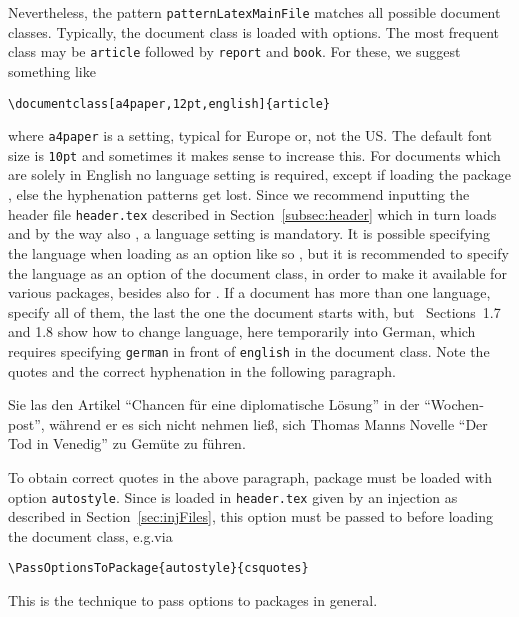 Nevertheless, the pattern \texttt{patternLatexMainFile} 
matches all possible document classes. 
Typically, the document class is loaded with options. 
The most frequent class may be \texttt{article} 
followed by \texttt{report} and \texttt{book}. 
For these, we suggest something like
%
\begin{Verbatim}
\documentclass[a4paper,12pt,english]{article}
\end{Verbatim}
%
where \texttt{a4paper} is a setting, typical for Europe or, not the US\@. 
The default font size is \texttt{10pt} and sometimes it makes sense to increase this. 
For documents which are solely in English no language setting is required, 
except if loading the package , else the hyphenation patterns get lost. 
Since we recommend inputting the header file \texttt{header.tex} 
described in Section~\ref{subsec:header} which in turn loads  and 
by the way also , a language setting is mandatory. 
It is possible specifying the language when loading  as an option 
like so , 
but it is recommended to specify the language as an option of the document class, 
in order to make it available for various packages, 
besides  also for . 
If a document has more than one language, specify all of them, 
the last the one the document starts with, 
but~\cite{BabelP24} Sections~1.7 and 1.8 show how to change language, 
here temporarily into German, 
which requires specifying \texttt{german} in front of \texttt{english} 
in the document class. 
Note the quotes and the correct hyphenation in the following paragraph. 

\begin{otherlanguage}{german}
  Sie las den Artikel \enquote{Chancen für eine diplomatische Lösung} 
  in der "`Wochenpost"', während er es sich nicht nehmen ließ, %
  sich Thomas Manns Novelle "`{Der Tod in Venedig}"' zu Gemüte zu führen. %
\end{otherlanguage}

To obtain correct quotes in the above paragraph, 
package  must be loaded with option \texttt{autostyle}. 
Since  is loaded in \texttt{header.tex} 
given by an injection as described in Section~\ref{sec:injFiles}, 
this option must be passed to  
before loading the document class, e.g.\@ via 
%
\begin{Verbatim}[fontsize=\small]
  \PassOptionsToPackage{autostyle}{csquotes}
\end{Verbatim}
%
This is the technique to pass options to packages in general. 

